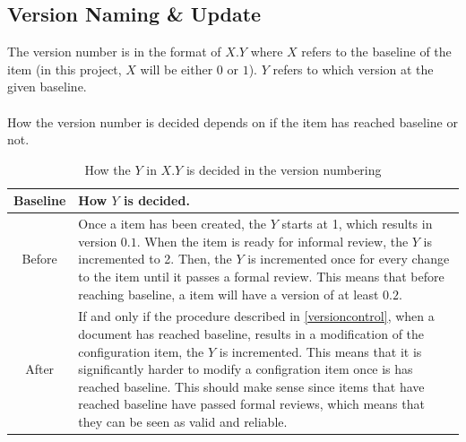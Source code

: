 \documentclass{article}
\begin{document}
    \subsection{Version Naming \& Update}
        The version number is in the format of $X.Y$ where $X$ refers to the baseline
        of the item (in this project, $X$ will be either $0$ or $1$). $Y$ refers
        to which version at the given baseline.
        \\ \\
        How the version number is decided depends on if the item has reached baseline or not.
        \begin{table}[h]
            \centering
            \begin{tabular}{|c|l|}
                \hline
                    \textbf{Baseline} & \textbf{How $Y$ is decided.} \\
                \hline
                    Before & \parbox{.8\textwidth} { \vspace{.2cm}
                            Once a item has been created, the $Y$
                            starts at 1, which results in version $0.1$. When the item is ready for informal
                            review, the $Y$ is incremented to 2. Then, the $Y$ is incremented once for every change to the item until it passes a formal review. This means that before reaching baseline, a item will have a version of at least $0.2$.
                            \vspace{.2cm} } \\
                \hline
                    After & \parbox{.8\textwidth} { \vspace{.2cm}
                        If and only if the procedure described in \ref{versioncontrol}, when a document has reached baseline, results in a modification of the
                        configuration item, the $Y$ is incremented. This means that
                        it is significantly harder to modify a configration item once
                        is has reached baseline. This should make sense since items
                        that have reached baseline have passed formal reviews, which means
                        that they can be seen as valid and reliable.
                        \vspace{.2cm}} \\
                \hline
            \end{tabular}
            \caption{How the $Y$ in $X.Y$ is decided in the version numbering}
            \label{versionnumber}
        \end{table}
\end{document}
